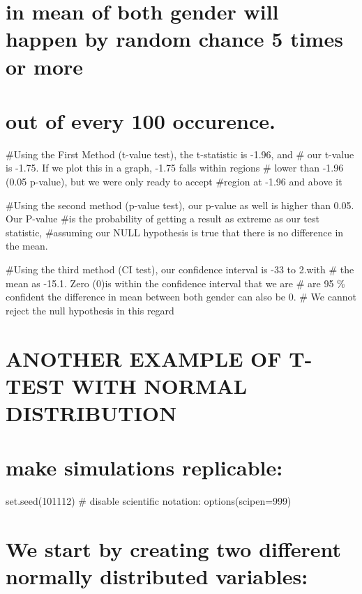 \documentclass[
]{article}
\begin{document}
\hypertarget{in-mean-of-both-gender-will-happen-by-random-chance-5-times-or-more}{%
\section{in mean of both gender will happen by random chance 5 times or
more}\label{in-mean-of-both-gender-will-happen-by-random-chance-5-times-or-more}}

\hypertarget{out-of-every-100-occurence.}{%
\section{out of every 100
occurence.}\label{out-of-every-100-occurence.}}

\#Using the First Method (t-value test), the t-statistic is -1.96, and
\# our t-value is -1.75. If we plot this in a graph, -1.75 falls within
regions \# lower than -1.96 (0.05 p-value), but we were only ready to
accept \#region at -1.96 and above it

\#Using the second method (p-value test), our p-value as well is higher
than 0.05. Our P-value \#is the probability of getting a result as
extreme as our test statistic, \#assuming our NULL hypothesis is true
that there is no difference in the mean.

\#Using the third method (CI test), our confidence interval is -33 to
2.with \# the mean as -15.1. Zero (0)is within the confidence interval
that we are \# are 95 \% confident the difference in mean between both
gender can also be 0. \# We cannot reject the null hypothesis in this
regard

\hypertarget{another-example-of-t-test-with-normal-distribution}{%
\section{ANOTHER EXAMPLE OF T-TEST WITH NORMAL
DISTRIBUTION}\label{another-example-of-t-test-with-normal-distribution}}

\hypertarget{make-simulations-replicable}{%
\section{make simulations
replicable:}\label{make-simulations-replicable}}

set.seed(101112) \# disable scientific notation: options(scipen=999)

\hypertarget{we-start-by-creating-two-different-normally-distributed-variables}{%
\section{We start by creating two different normally distributed
variables:}\label{we-start-by-creating-two-different-normally-distributed-variables}}
\end{document}
